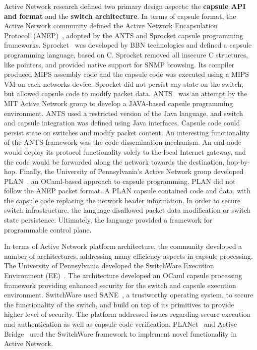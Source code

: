 Active Network research defined two primary design aspects:
the {\bf capsule API and format} and the {\bf switch architecture}. In
terms of capsule format, the Active Network community defined the Active Network
Encapsulation Protocol~(ANEP)~, adopted by the ANTS and
Sprocket capsule programming frameworks.  Sprocket~ was
developed by BBN technologies and defined a capsule programming language, based
on C. Sprocket removed all insecure C structures, like pointers,
and provided native support for SNMP browsing.  Its compiler produced MIPS
assembly code and the capsule code was executed using a MIPS VM on each networks
device.  Sprocket did not persist any state on the switch, but allowed
capsule code to modify packet data.  ANTS~ was an attempt
by the MIT Active Network group to develop a JAVA-based capsule programming
environment.  ANTS used a restricted version of the Java language, and switch and
capsule integration was defined using Java interfaces. Capsule code could
persist state on switches and modify packet content. An interesting
functionality of the ANTS framework was the code dissemination mechanism. An
end-node would deploy its protocol functionality solely to the local Internet
gateway, and the code would be forwarded along the network towards the
destination, hop-by-hop. Finally, the University of Pennsylvania's Active Network
group developed PLAN~, an OCaml-based approach to capsule
programming.  PLAN did not follow the ANEP packet format. A PLAN capsule
contained code and data, with the capsule code replacing the network header
information. In order to secure switch infrastructure, the language disallowed
packet data modification or switch state persistence.  Ultimately, the language
provided a framework for programmable control plane.

In terms of Active Network platform architecture, the community developed a
number of architectures, addressing many efficiency aspects in capsule
processing. The University of Pennsylvania developed the SwitchWare Execution
Environment (EE)~.  The architecture developed an OCaml
capsule processing framework providing enhanced security for the switch and
capsule execution environment.  SwitchWare used SANE~, a
trustworthy operating system, to secure the functionality of the switch, and
build on top of its primitives to provide higher level of security. The platform
addressed issues regarding secure execution and authentication as well as
capsule code verification.  PLANet~ and Active
Bridge~ used the SwitchWare framework to implement novel
functionality in Active Network. 

